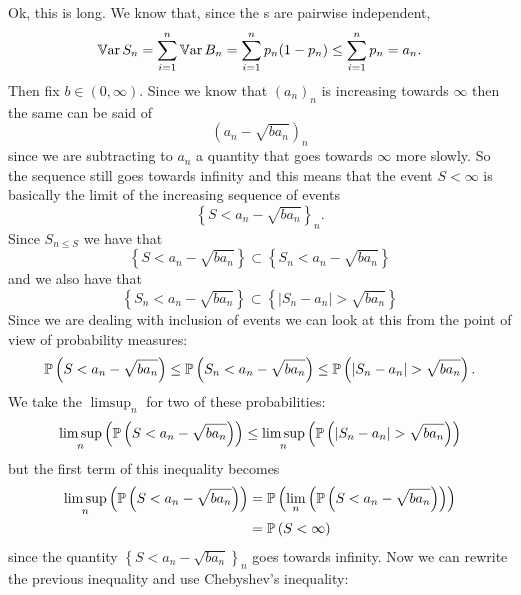 \documentclass{report}
\begin{document}
\begin{fancyproof}
	Ok, this is long. We know that, since the \rv s are pairwise independent,
	\begin{equation*}
		\mathbb{V}\mathrm{ar}\, S_{n}=\sum_{i=1}^{n} \mathbb{V}\mathrm{ar}\, B_{n}=\sum_{i=1}^{n} p_{n}(1-p_{n})\leq\sum_{i=1}^{n}p_n=a_{n}.
	\end{equation*}
	Then fix $b\in(0,\infty)$. Since we know that ${(a_{n})}_{n}$ is increasing towards $\infty$ then the same can be said of 
	\begin{equation*}
		{\left(a_{n}-\sqrt{ba_{n}}\right)}_{n}
	\end{equation*}
	since we are subtracting to $a_{n}$ a quantity that goes towards $\infty$ more slowly. So the sequence still goes towards infinity and this means that the event ${S<\infty}$ is basically the limit of the increasing sequence of events 
	\[{\left\{S<a_{n}-\sqrt{ba_{n}}\right\}}_{n}.\]
	Since $S_{n\leq S}$ we have that
	\begin{equation*}
		\left\{S<a_{n}-\sqrt{ba_{n}}\right\}\subset\left\{S_{n}<a_{n}-\sqrt{ba_{n}}\right\}
	\end{equation*}
	and we also have that
	\begin{equation*}
		\left\{S_{n}<a_{n}-\sqrt{ba_{n}}\right\}\subset\left\{|S_{n}-a_{n}|>\sqrt{ba_{n}}\right\}
	\end{equation*}
	Since we are dealing with inclusion of events we can look at this from the point of view of probability measures:
	\begin{equation*}
		\pr\left(S<a_{n}-\sqrt{ba_{n}}\right)\leq\pr\left(S_{n}<a_{n}-\sqrt{ba_{n}}\right)\leq\pr\left(|S_{n}-a_{n}|>\sqrt{ba_{n}}\right).
	\end{equation*}
	We take the $\limsup_n$ for two of these probabilities:
	\begin{equation*}
		\limsup_n\left(\pr\left(S<a_{n}-\sqrt{ba_{n}}\right)\right)\leq\limsup_n\left(\pr\left(|S_{n}-a_{n}|>\sqrt{ba_{n}}\right)\right)
	\end{equation*}
	but the first term of this inequality becomes
	\begin{align*}
			\limsup_n\left(\mathbb{P}\left(S<a_{n}-\sqrt{ba_{n}}\right)\right)&=\mathbb{P}\left(\lim_{n}\left(\mathbb{P}\left(S<a_{n}-\sqrt{ba_{n}}\right)\right)\right)\\
			&=\mathbb{P}\left(S<\infty\right)
	\end{align*}
	since the quantity ${\left\{S<a_{n}-\sqrt{ba_{n}}\right\}}_{n}$ goes towards infinity. Now we can rewrite the previous inequality and use Chebyshev's inequality:
	\begin{align*}

\end{align*}
\end{fancyproof}
\end{document}
